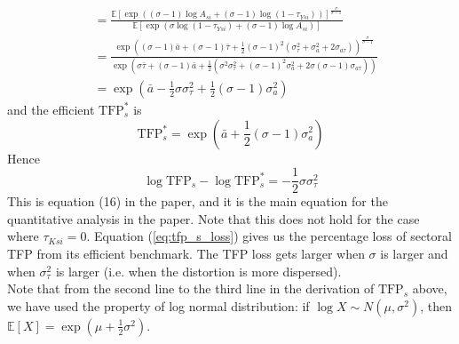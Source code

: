 \documentclass[12pt]{article}
\begin{document}
\begin{itemize}
\begin{align*}
	& = \frac{\mathbb{E}\left[\exp\left((\sigma-1) \log A_{si} + (\sigma -1) \log (1-\tau_{Ysi})\right)\right]^{\frac{\sigma}{\sigma-1}}}{\mathbb{E}\left[\exp(\sigma \log (1-\tau_{Ysi}) + (\sigma-1) \log A_{si})\right]} \\
	& = \frac{\exp\left((\sigma-1) \bar{a} + (\sigma -1) \bar{\tau} + \frac{1}{2} (\sigma-1)^2 (\sigma^2_\tau + \sigma^2_a + 2 \sigma_{a \tau})\right)^{\frac{\sigma}{\sigma-1}}}{\exp\left(\sigma \bar{\tau} + (\sigma -1) \bar{a} + \frac{1}{2} (\sigma^2 \sigma^2_\tau + (\sigma-1)^2 \sigma^2_a + 2 \sigma (\sigma-1) \sigma_{a \tau}) \right)} \\
	& = \exp\left(\bar{a} - \frac{1}{2} \sigma \sigma^2_\tau + \frac{1}{2} (\sigma-1) \sigma^2_a\right)
\end{align*}
and the efficient $\text{TFP}^*_s$ is 
\[\text{TFP}_s^* = \exp\left(\bar{a} + \frac{1}{2} (\sigma-1) \sigma^2_a\right)\]
Hence
\begin{equation} \label{eq:tfp_s_loss}
	\log \text{TFP}_s - \log \text{TFP}_s^* = - \frac{1}{2} \sigma \sigma^2_\tau
\end{equation}
This is equation (16) in the paper, and it is the main equation for the quantitative analysis in the paper. Note that this does not hold for the case where $\tau_{Ksi} = 0$. Equation (\ref{eq:tfp_s_loss}) gives us the percentage loss of sectoral TFP from its efficient benchmark. The TFP loss gets larger when $\sigma$ is larger and when $\sigma^2_\tau$ is larger (i.e. when the distortion is more dispersed). \\
Note that from the second line to the third line in the derivation of $\text{TFP}_s$ above, we have used the property of log normal distribution: if $\log X \sim N(\mu, \sigma^2)$, then $\mathbb{E}[X] = \exp(\mu + \frac{1}{2} \sigma^2)$.
\end{itemize}
	
\end{document}
